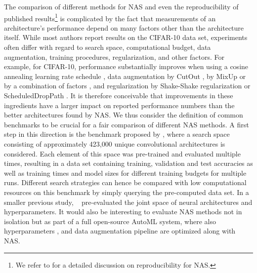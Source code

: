 \documentclass[twoside,11pt]{article}
\renewcommand{\cite}[1]{\citep{#1}}
\newcommand{\crc}[1]{#1}
\begin{document}
The comparison of different methods for NAS \crc{and even the reproducibility of published results\footnote{We refer to  \citet{li_repro_nas} for a detailed discussion on reproducibility for NAS. }} is complicated by the fact that measurements of an architecture's performance depend on many factors other than the architecture itself. While most authors report results on the CIFAR-10 data set, experiments often differ with regard to search space, computational budget, data augmentation, training procedures, regularization, and other factors. For example, for CIFAR-10, performance substantially improves when using a cosine annealing learning rate schedule \citep{DBLP:journals/corr/LoshchilovH16a}, data augmentation by CutOut \citep{cutout}, by MixUp \citep{mixup} or by a combination of factors \citep{cubuk_autoaugment:_2018}, and regularization by Shake-Shake regularization \citep{DBLP:journals/corr/Gastaldi17} or ScheduledDropPath \citep{DBLP:journals/corr/ZophVSL17}.
%
It is therefore conceivable that improvements in these ingredients have a larger impact on reported performance numbers than the better architectures found by NAS. We thus consider the definition of common benchmarks to be crucial for a fair comparison of different NAS methods. \crc{A first step in this direction is the benchmark proposed by \citet{aaron_nasbench}, where a search space consisting of approximately 423,000 unique convolutional architectures is considered. Each element of this space was pre-trained and evaluated multiple times, resulting in a data set containing training, validation and test accuracies as well as training times and model sizes for different training budgets for multiple runs. Different search strategies can hence be compared with low computational resources on this benchmark by simply querying the pre-computed data set. In a smaller previous study, ~\citet{klein_rml2018} pre-evaluated the joint space of neural architectures and hyperparameters.}
It would also be interesting to evaluate NAS methods not in isolation but as part of a full open-source AutoML system, where also hyperparameters \cite{mendoza_towards_2016, DBLP:journals/corr/RealMSSSLK17, Zela_AutoML2018}, and data augmentation pipeline \cite{cubuk_autoaugment:_2018} are optimized along with NAS. 
\end{document}
